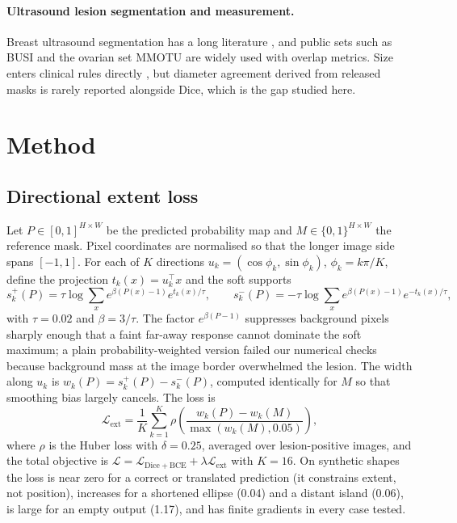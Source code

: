 \documentclass{midl}
\begin{document}
\paragraph{Ultrasound lesion segmentation and measurement.} Breast ultrasound segmentation has a long literature \citep{xian2018bus}, and public sets such as BUSI \citep{aldhabyani2020busi} and the ovarian set MMOTU \citep{zhao2022mmotu} are widely used with overlap metrics. Size enters clinical rules directly \citep{timmerman2008iota,acr2013birads}, but diameter agreement derived from released masks is rarely reported alongside Dice, which is the gap studied here.

\section{Method}

\subsection{Directional extent loss}
Let $P\in[0,1]^{H\times W}$ be the predicted probability map and $M\in\{0,1\}^{H\times W}$ the reference mask. Pixel coordinates are normalised so that the longer image side spans $[-1,1]$. For each of $K$ directions $u_k=(\cos\phi_k,\sin\phi_k)$, $\phi_k=k\pi/K$, define the projection $t_k(x)=u_k^\top x$ and the soft supports
\begin{equation}\label{eq:support}
s_k^{+}(P)=\tau\log\sum_x e^{\beta(P(x)-1)}e^{t_k(x)/\tau},\qquad
s_k^{-}(P)=-\tau\log\sum_x e^{\beta(P(x)-1)}e^{-t_k(x)/\tau},
\end{equation}
with $\tau=0.02$ and $\beta=3/\tau$. The factor $e^{\beta(P-1)}$ suppresses background pixels sharply enough that a faint far-away response cannot dominate the soft maximum; a plain probability-weighted version failed our numerical checks because background mass at the image border overwhelmed the lesion. The width along $u_k$ is $w_k(P)=s_k^{+}(P)-s_k^{-}(P)$, computed identically for $M$ so that smoothing bias largely cancels. The loss is
\begin{equation}\label{eq:ext}
\mathcal{L}_{\mathrm{ext}}=\frac{1}{K}\sum_{k=1}^{K}\rho\!\left(\frac{w_k(P)-w_k(M)}{\max(w_k(M),0.05)}\right),
\end{equation}
where $\rho$ is the Huber loss \citep{huber1964robust} with $\delta=0.25$, averaged over lesion-positive images, and the total objective is $\mathcal{L}=\mathcal{L}_{\mathrm{Dice+BCE}}+\lambda\mathcal{L}_{\mathrm{ext}}$ with $K=16$. On synthetic shapes the loss is near zero for a correct or translated prediction (it constrains extent, not position), increases for a shortened ellipse (0.04) and a distant island (0.06), is large for an empty output (1.17), and has finite gradients in every case tested.
\end{document}
